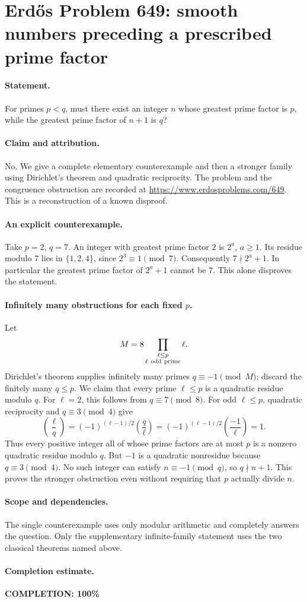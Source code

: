 \section*{Erd\H{o}s Problem 649: smooth numbers preceding a prescribed prime factor}

\paragraph{Statement.}
For primes \(p<q\), must there exist an integer \(n\) whose greatest prime
factor is \(p\), while the greatest prime factor of \(n+1\) is \(q\)?

\paragraph{Claim and attribution.}
No. We give a complete elementary counterexample and then a stronger
family using Dirichlet's theorem and quadratic reciprocity.
The problem and the congruence obstruction are recorded at
\url{https://www.erdosproblems.com/649}. This is a reconstruction of a
known disproof.

\paragraph{An explicit counterexample.}
Take \(p=2\), \(q=7\). An integer with greatest prime factor \(2\)
is \(2^a\), \(a\geq1\). Its residue modulo \(7\) lies in
\(\{1,2,4\}\), since \(2^3\equiv1\pmod7\).
Consequently \(7\nmid 2^a+1\). In particular the greatest prime factor
of \(2^a+1\) cannot be \(7\). This alone disproves the statement.

\paragraph{Infinitely many obstructions for each fixed \(p\).}
Let
\[
 M=8\prod_{\substack{\ell\leq p\\\ell\ {\rm odd\ prime}}}\ell.
\]
Dirichlet's theorem supplies infinitely many primes \(q\equiv-1\pmod M\);
discard the finitely many \(q\leq p\). We claim that every prime
\(\ell\leq p\) is a quadratic residue modulo \(q\).
For \(\ell=2\), this follows from \(q\equiv7\pmod8\).
For odd \(\ell\leq p\), quadratic reciprocity and \(q\equiv3\pmod4\)
give
\[
 \left(\frac{\ell}{q}\right)
 =(-1)^{(\ell-1)/2}\left(\frac{q}{\ell}\right)
 =(-1)^{(\ell-1)/2}\left(\frac{-1}{\ell}\right)=1.
\]
Thus every positive integer all of whose prime factors are at most
\(p\) is a nonzero quadratic residue modulo \(q\).
But \(-1\) is a quadratic nonresidue because \(q\equiv3\pmod4\).
No such integer can satisfy \(n\equiv-1\pmod q\), so \(q\nmid n+1\).
This proves the stronger obstruction even without requiring that \(p\)
actually divide \(n\).

\paragraph{Scope and dependencies.}
The single counterexample uses only modular arithmetic and completely
answers the question. Only the supplementary infinite-family statement
uses the two classical theorems named above.

\paragraph{Completion estimate.}
\textbf{COMPLETION: 100\%}
